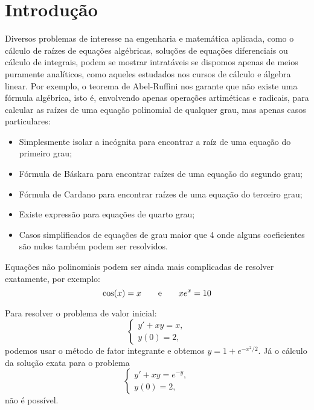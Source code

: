 \chapter{Introdução}

Diversos problemas de interesse na engenharia e matemática aplicada, como  o cálculo de raízes de equações algébricas, soluções de equações diferenciais ou cálculo de integrais, podem se mostrar intratáveis se dispomos apenas de meios puramente analíticos, como aqueles estudados nos cursos de cálculo e álgebra linear. Por exemplo, o teorema de Abel-Ruffini nos garante que não existe uma fórmula algébrica, isto é, envolvendo apenas operações artiméticas e radicais, para calcular as raízes de uma equação polinomial de qualquer grau, mas apenas casos particulares:
\begin{itemize}
\item Simplesmente isolar a incógnita para encontrar a raíz de uma equação do primeiro grau;
\item Fórmula de Báskara para encontrar raízes de uma equação do segundo grau;
\item Fórmula de Cardano para encontrar raízes de uma equação do terceiro grau;
\item Existe expressão para equações de quarto grau;
\item Casos simplificados de equações de grau maior que 4 onde alguns coeficientes são nulos também podem ser resolvidos.
\end{itemize}

Equações não polinomiais podem ser ainda mais complicadas de resolver exatamente, por exemplo:
\begin{equation}
\cos(x)=x\qquad \hbox{e}\qquad xe^x= 10
\end{equation}

Para resolver o problema de valor inicial:
\begin{equation}
\left\{
\begin{array}{l}
y'+xy=x,\\
y(0)=2,
\end{array}\right.
\end{equation}
podemos usar o método de fator integrante e obtemos $y=1+e^{-x^2/2}$. Já o cálculo da solução exata para o problema 
\begin{equation}
\left\{
\begin{array}{l}
y'+xy=e^{-y},\\
y(0)=2,
\end{array}\right.
\end{equation}
não é possível.

